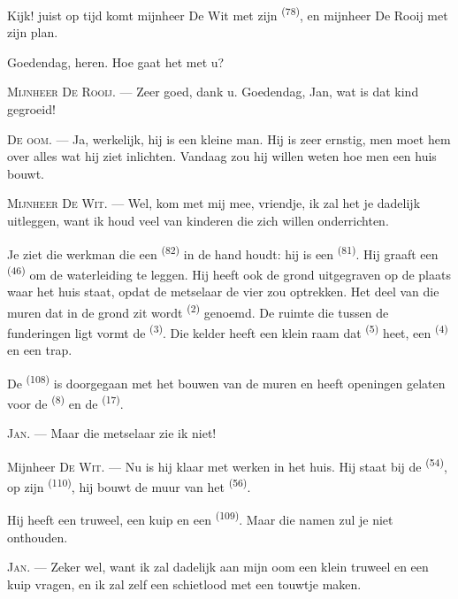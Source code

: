 Kijk! juist op tijd komt mijnheer De Wit met zijn  \textsuperscript{(78)}, en
mijnheer De Rooij met zijn plan.

Goedendag, heren. Hoe gaat het met u?

\textsc{Mijnheer De Rooij}. --- Zeer goed, dank u. Goedendag, Jan, wat is dat kind gegroeid!

\textsc{De oom}. --- Ja, werkelijk, hij is een kleine man. Hij is zeer ernstig, men moet hem
over alles wat hij ziet inlichten. Vandaag zou hij willen weten hoe men een huis bouwt.

\VUsaut{3.0mm}

\textsc{Mijnheer De Wit}. --- Wel, kom met mij mee, vriendje, ik zal het je dadelijk
uitleggen, want ik houd veel van kinderen die zich willen onderrichten.

Je ziet die werkman die een  \textsuperscript{(82)} in de hand houdt: hij is een
 \textsuperscript{(81)}. Hij graaft een
 \textsuperscript{(46)} om de waterleiding te leggen. Hij heeft
ook de grond uitgegraven op de plaats waar het huis staat, opdat de metselaar de vier
 zou optrekken. Het deel van die muren dat in de grond zit wordt
 \textsuperscript{(2)} genoemd. De ruimte die tussen de funderingen ligt
vormt de  \textsuperscript{(3)}. Die kelder heeft een klein raam dat
 \textsuperscript{(5)} heet, een
 \textsuperscript{(4)} en een trap.

De  \textsuperscript{(108)} is doorgegaan met het bouwen van de muren en
heeft openingen gelaten voor de  \textsuperscript{(8)} en de 
\textsuperscript{(17)}.

\textsc{Jan}. --- Maar die metselaar zie ik niet!

Mijnheer \textsc{De Wit}. --- Nu is hij klaar met werken in het huis. Hij staat bij de
 \textsuperscript{(54)}, op zijn  \textsuperscript{(110)},
hij bouwt de muur van het  \textsuperscript{(56)}.

Hij heeft een truweel, een kuip en een  \textsuperscript{(109)}. Maar die
namen zul je niet onthouden.

\textsc{Jan}. --- Zeker wel, want ik zal dadelijk aan mijn oom een klein truweel en een kuip
vragen, en ik zal zelf een schietlood met een touwtje maken.

